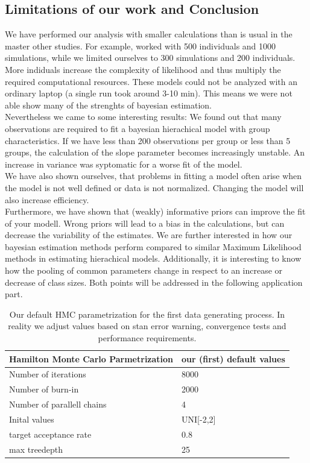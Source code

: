 \subsection{Limitations of our work and Conclusion}


We have performed our analysis with smaller calculations than is usual in the master other studies. 
For example, \cite{stegmueller2013} worked with 500 individuals and 1000 simulations, while we limited ourselves to 300 simulations and 200 individuals. More indiduals increase the complexity of likelihood and thus multiply the required computational resources. 
These models could not be analyzed with an ordinary laptop (a single run took around 3-10 min). This means we were not able show many of the strenghts of bayesian estimation.\\
Nevertheless we came to some interesting results: 
We found out that many observations are required to fit a bayesian hierachical model with group characteristics. If we have less than 200 observations per group or less than 5 groups,  the calculation of the slope parameter becomes increasingly unstable.  
An increase in variance was syptomatic for a worse fit of the model.
\\
We have also shown ourselves, that problems in fitting a model often arise when the model is not well defined or data is not normalized. Changing the model will also increase efficiency.\\
Furthermore, we have shown that (weakly) informative priors can improve the fit of your modell. Wrong priors will lead to a bias in the calculations, but can decrease the variability of the estimates. 
We are further interested in how our bayesian estimation methods perform compared to similar Maximum Likelihood methods in estimating hierachical models. 
Additionally, it is interesting to know how the pooling of common parameters change in respect to an increase or decrease of class sizes. 
Both points will be addressed in the following application part.

\newpage

\begin{table}[!ht]
\begin{center}
\begin{tabular}{l l}
Hamilton Monte Carlo Parmetrization & our (first) default values\\
\hline
Number of iterations &8000  \\
Number of burn-in & 2000  \\
Number of parallell chains & 4  \\
Inital values & UNI[-2,2]  \\
target acceptance rate & 0.8  \\
max treedepth & 25 \\
\end{tabular}
\end{center}
\caption{Our default HMC parametrization for the first data generating process. In reality we adjust values based on stan error warning, convergence tests and performance requirements.}
\label{tab:default_1}
\end{table}


